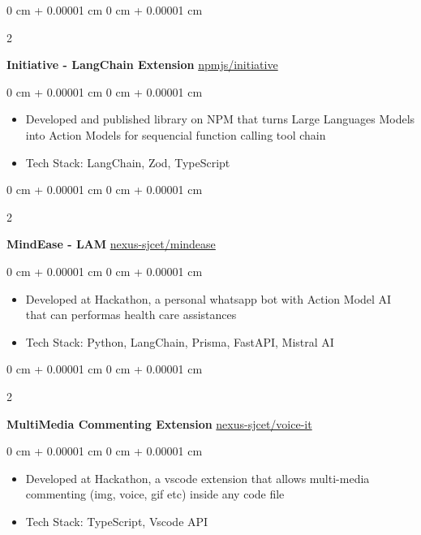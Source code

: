 \documentclass[10pt, letterpaper]{article}
\newenvironment{highlights}{
    \begin{itemize}[
        topsep=0.10 cm,
        parsep=0.10 cm,
        partopsep=0pt,
        itemsep=0pt,
        leftmargin=0 cm + 10pt
    ]
}{
    \end{itemize}
} %
\newenvironment{onecolentry}{
    \begin{adjustwidth}{
        0 cm + 0.00001 cm
    }{
        0 cm + 0.00001 cm
    }
}{
    \end{adjustwidth}
} %
\newenvironment{twocolentry}[2][]{
    \onecolentry
    \def\secondColumn{#2}
    \setcolumnwidth{\fill, 4.5 cm}
    \begin{paracol}{2}
}{
    \switchcolumn \raggedleft \secondColumn
    \end{paracol}
    \endonecolentry
} %
\begin{document}
\begin{twocolentry}{
        \href{https://www.npmjs.com/package/initiative}{npmjs/initiative}
    }
    \textbf{Initiative - LangChain Extension}\end{twocolentry}

\vspace{0.10 cm}
\begin{onecolentry}
    \begin{highlights}
        \item Developed and published library on NPM that turns Large Languages Models into
        Action Models for sequencial function calling tool chain
        \item Tech Stack: LangChain, Zod, TypeScript
    \end{highlights}
\end{onecolentry}
\vspace{0.2 cm}

\begin{twocolentry}{
        \href{https://github.com/nexus-sjcet/mindease}{nexus-sjcet/mindease}
    }
    \textbf{MindEase - LAM}\end{twocolentry}

\vspace{0.10 cm}
\begin{onecolentry}
    \begin{highlights}
        \item Developed at Hackathon, a personal whatsapp bot with Action Model AI that can
        performas health care assistances
        \item Tech Stack: Python, LangChain, Prisma, FastAPI, Mistral AI
    \end{highlights}
\end{onecolentry}
\vspace{0.2 cm}

\begin{twocolentry}{
        \href{https://github.com/nexus-sjcet/voice-it}{nexus-sjcet/voice-it}
    }
    \textbf{MultiMedia Commenting Extension}\end{twocolentry}

\vspace{0.10 cm}
\begin{onecolentry}
    \begin{highlights}
        \item Developed at Hackathon, a vscode extension that allows multi-media commenting
        (img, voice, gif etc) inside any code file
        \item Tech Stack: TypeScript, Vscode API
    \end{highlights}
\end{onecolentry}
\vspace{0.2 cm}
\end{document}
